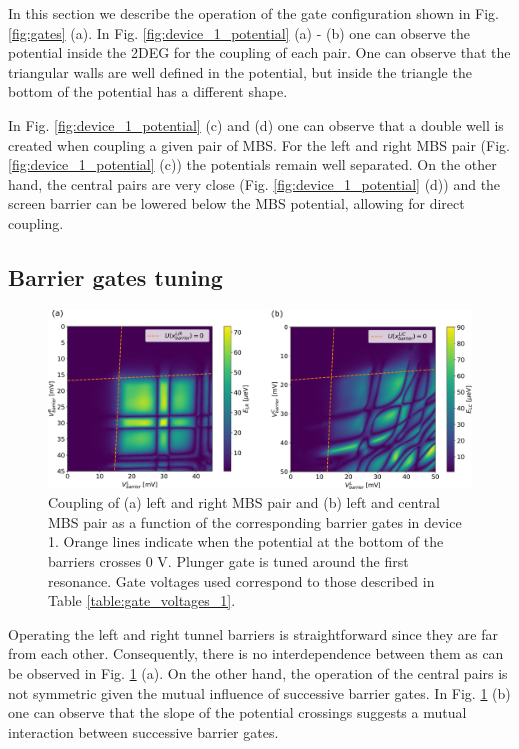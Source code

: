 In this section we describe the operation of the gate configuration shown in Fig. \ref{fig:gates} (a).
In Fig.  \ref{fig:device_1_potential} (a) - (b) one can observe the potential inside the 2DEG for the coupling of each pair.
One can observe that the triangular walls are well defined in the potential, but inside the triangle the bottom of the potential has a different shape.

In Fig. \ref{fig:device_1_potential} (c) and (d) one can observe that a double well is created when coupling a given pair of MBS.
For the left and right MBS pair (Fig. \ref{fig:device_1_potential} (c)) the potentials remain well separated.
On the other hand, the central pairs are very close (Fig. \ref{fig:device_1_potential} (d)) and the screen barrier can be lowered below the MBS potential, allowing for direct coupling.

\subsection{Barrier gates tuning}

\begin{figure}
\centering
  \includegraphics[width=\linewidth]{figures/device_1_barriers.pdf}
  \caption{Coupling of (a) left and right MBS pair and (b) left and central MBS pair as a function of the corresponding barrier gates in device 1. Orange lines indicate when the potential at the bottom of the barriers crosses $0$ V. Plunger gate is tuned around the first resonance. Gate voltages used correspond to those described in Table \ref{table:gate_voltages_1}.}
  \label{fig:device_1_barriers}
\end{figure}

Operating the left and right tunnel barriers is straightforward since they are far from each other.
Consequently, there is no interdependence between them as can be observed in Fig. \ref{fig:device_1_barriers} (a).
On the other hand, the operation of the central pairs is not symmetric given the mutual influence of successive barrier gates.
In Fig. \ref{fig:device_1_barriers} (b) one can observe that the slope of the potential crossings suggests a mutual interaction between successive barrier gates.

